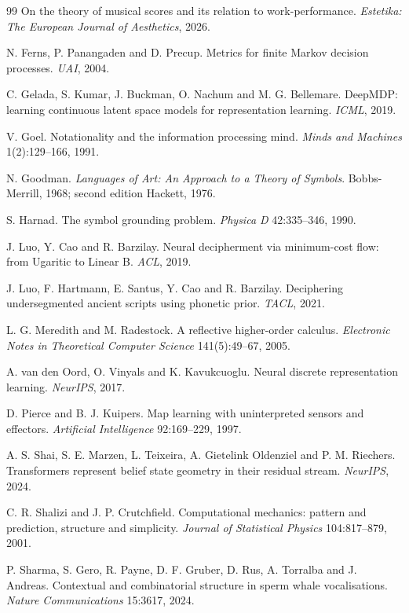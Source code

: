 \documentclass[11pt,a4paper]{article}
\theoremstyle{definition}
\theoremstyle{plain}
\theoremstyle{remark}
\begin{document}
\begin{thebibliography}{99}
 On the theory of musical scores and its relation to
work-performance. \emph{Estetika: The European Journal of Aesthetics}, 2026.

 N. Ferns, P. Panangaden and D. Precup. Metrics for finite Markov
decision processes. \emph{UAI}, 2004.

 C. Gelada, S. Kumar, J. Buckman, O. Nachum and M. G. Bellemare.
DeepMDP: learning continuous latent space models for representation learning. \emph{ICML},
2019.

 V. Goel. Notationality and the information processing mind.
\emph{Minds and Machines} 1(2):129--166, 1991.

 N. Goodman. \emph{Languages of Art: An Approach to a Theory of
Symbols}. Bobbs-Merrill, 1968; second edition Hackett, 1976.

 S. Harnad. The symbol grounding problem. \emph{Physica D}
42:335--346, 1990.

 J. Luo, Y. Cao and R. Barzilay. Neural decipherment via minimum-cost
flow: from Ugaritic to Linear B. \emph{ACL}, 2019.

 J. Luo, F. Hartmann, E. Santus, Y. Cao and R. Barzilay. Deciphering
undersegmented ancient scripts using phonetic prior. \emph{TACL}, 2021.

 L. G. Meredith and M. Radestock. A reflective higher-order
calculus. \emph{Electronic Notes in Theoretical Computer Science} 141(5):49--67, 2005.

 A. van den Oord, O. Vinyals and K. Kavukcuoglu. Neural discrete
representation learning. \emph{NeurIPS}, 2017.

 D. Pierce and B. J. Kuipers. Map learning with uninterpreted sensors
and effectors. \emph{Artificial Intelligence} 92:169--229, 1997.

 A. S. Shai, S. E. Marzen, L. Teixeira, A. Gietelink Oldenziel and
P. M. Riechers. Transformers represent belief state geometry in their residual stream.
\emph{NeurIPS}, 2024.

 C. R. Shalizi and J. P. Crutchfield. Computational mechanics:
pattern and prediction, structure and simplicity. \emph{Journal of Statistical Physics}
104:817--879, 2001.

 P. Sharma, S. Gero, R. Payne, D. F. Gruber, D. Rus, A. Torralba and
J. Andreas. Contextual and combinatorial structure in sperm whale vocalisations.
\emph{Nature Communications} 15:3617, 2024.


\end{thebibliography}
\end{document}
